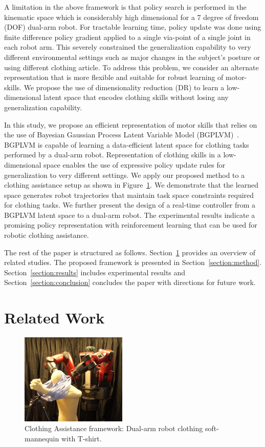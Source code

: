 \documentclass{article}
\begin{document}
A limitation in the above framework is that policy search is performed in the kinematic space which is considerably high dimensional for a 7 degree of freedom (DOF) dual-arm robot. For tractable learning time, policy update was done using finite difference policy gradient applied to a single via-point of a single joint in each robot arm. This severely constrained the generalization capability to very different environmental settings such as major changes in the subject's posture or using different clothing article. To address this problem, we consider an alternate representation that is more flexible and suitable for robust learning of motor-skills. We propose the use of dimensionality reduction (DR) to learn a low-dimensional latent space that encodes clothing skills without losing any generalization capability.

In this study, we propose an efficient representation of motor skills that relies on the use of Bayesian Gaussian Process Latent Variable Model (BGPLVM)~\cite{bgplvm}. BGPLVM is capable of learning a data-efficient latent space for clothing tasks performed by a dual-arm robot. Representation of clothing skills in a low-dimensional space enables the use of expressive policy update rules for generalization to very different settings. We apply our proposed method to a clothing assistance setup as shown in Figure~\ref{figure:setup}. We demonstrate that the learned space generates robot trajectories that maintain task space constraints required for clothing tasks. We further present the design of a real-time controller from a BGPLVM latent space to a dual-arm robot. The experimental results indicate a promising policy representation with reinforcement learning that can be used for robotic clothing assistance.

The rest of the paper is structured as follows. Section~\ref{section:literature} provides an overview of related studies. The proposed framework is presented in Section~\ref{section:method}. Section~\ref{section:results} includes experimental results and Section~\ref{section:conclusion} concludes the paper with directions for future work.

\section{Related Work}
\label{section:literature}

\begin{figure}[t]
  \centering
  \includegraphics[width=0.45\textwidth, height=0.2\textheight]{setup.png}
  \caption{Clothing Assistance framework: Dual-arm robot clothing soft-mannequin with T-shirt.}
  \label{figure:setup}
\end{figure}
\end{document}
